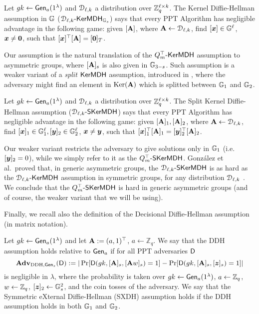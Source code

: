 \begin{definition} Let  ${gk} 
\gets\mathsf{Gen}_a(1^\lambda)$ and $\mathcal{D}_{\ell,k}$ a distribution over $\mathbb{Z}_q^{\ell\times k}$.
The Kernel Diffie-Hellman assumption in $\mathbb{G}$ ($\mathcal{D}_{\ell,k}\mbox{-}\mathsf{KerMDH}_{\mathbb{G}_s}$) says that every PPT Algorithm has negligible advantage in the following  game: given $[\mathbf{{A}}]$, where $\mathbf{{A}} \gets \mathcal{D}_{\ell,k}$, find $[{\boldsymbol{x}}] \in \mathbb{G}^{\ell}$, ${\boldsymbol{x}} \neq {\boldsymbol{0}}$, such that 
$[{\boldsymbol{x}}]^{\top}[\mathbf{{A}}]=[{\boldsymbol{0}}]_T$. 
\end{definition}

Our assumption is the natural translation of the $Q_m^\top\mbox{-}\mathsf{KerMDH}$ assumption to asymmetric groups, where  $[\mathbf{{A}}]_s$ is also given in $\mathbb{G}_{3-s}$.  Such assumption is a weaker variant of a \emph{split} $\mathsf{KerMDH}$ assumption, introduced in \cite{AC:GonHevRaf15}, where the adversary might find an element in $\mathrm{Ker}(\mathbf{{A}})$ which is splitted between $\mathbb{G}_1$ and $\mathbb{G}_2$.

\begin{definition} Let  ${gk} 
\gets\mathsf{Gen}_a(1^\lambda)$ and $\mathcal{D}_{\ell,k}$ a distribution over $\mathbb{Z}_q^{\ell\times k}$.
The Split Kernel Diffie-Hellman assumption ($\mathcal{D}_{\ell,k}\mbox{-}\mathsf{SKerMDH}$) says that every PPT Algorithm has negligible advantage in the following  game: given $[\mathbf{{A}}]_1,[\mathbf{{A}}]_2$, where $\mathbf{{A}} \gets \mathcal{D}_{\ell,k}$, find $[{\boldsymbol{x}}]_1\in\mathbb{G}_1^\ell,[{\boldsymbol{y}}]_2 \in \mathbb{G}^{\ell}_{2}$, ${\boldsymbol{x}}\neq{\boldsymbol{y}}$, such that 
$[{\boldsymbol{x}}]_{1}^{\top}[\mathbf{{A}}]_1=[{\boldsymbol{y}}]_2^\top[\mathbf{{A}}]_2$. 
\end{definition}
 Our weaker variant restricts the adversary to give solutions only in $\mathbb{G}_1$ (i.e.~$[{\boldsymbol{y}}]_2=0$), while we simply refer to it as the $Q_m^\top\mbox{-}\mathsf{SKerMDH}$.
Gonz\'alez et al.~proved that, in generic asymmetric groups, the $\mathcal{D}_{\ell,k}\mbox{-}\mathsf{SKerMDH}$ is as hard as the $\mathcal{D}_{\ell,k}\mbox{-}\mathsf{KerMDH}$ assumption in symmetric groups, for any distribution $\mathcal{D}_{\ell,k}$ \cite{AC:GonHevRaf15}. We conclude that the $Q_m^\top\mbox{-}\mathsf{SKerMDH}$ is hard in generic asymmetric groups (and of course, the weaker variant that we will be using).

Finally, we recall also the definition of the Decisional Diffie-Hellman assumption (in matrix notation).

\begin{definition}\label{def:dlin}
 Let  ${gk} 
\gets \mathsf{Gen}_a(1^\lambda)$ and let $\mathbf{{A}} := (a,1)^\top$, $a\gets\mathbb{Z}_q$.
We say that the DDH assumption holds relative to $\mathsf{Gen}_a$ if for all PPT adversaries $\mathsf{D}$
$$
\mathbf{Adv}_{\mathrm{DDH},\mathsf{Gen}_s}(\mathsf{D}) := |
	\Pr[
		\mathsf{D}(
			gk,
			[\mathbf{{A}}]_s,
			[\mathbf{{A}}{w}]_s)=1]
	-\Pr[
		\mathsf{D}(
		gk,
		[\mathbf{{A}}]_s,
		[{\boldsymbol{z}}]_s)=1]|
$$
is negligible in $\lambda$, where the probability is taken over $gk\gets\mathsf{Gen}_a(1^\lambda)$, $a\gets\mathbb{Z}_q$, ${w}\gets\mathbb{Z}_q$, $[{\boldsymbol{z}}]_2\gets\mathbb{G}^2_s$, and the coin tosses of the adversary.
We say that the Symmetric eXternal Diffie-Hellman (SXDH) assumption holds if the DDH assumption holds in both $\mathbb{G}_1$ and $\mathbb{G}_2$.
\end{definition}